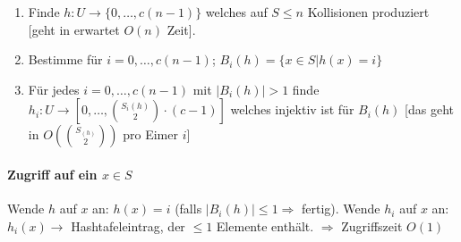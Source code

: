 \begin{enumerate}
	\item Finde $h : U \rightarrow \{ 0,\dots,c(n-1) \}$ welches auf $S \leq n$ Kollisionen produziert [geht in erwartet $O(n)$ Zeit]. 
	\item Bestimme für $i=0,\dots,c(n-1)$; $B_i(h)= \{ x \in S | h(x)=i \}$
	\item Für jedes $i=0,\dots,c(n-1)$ mit $|B_i(h)|>1$ finde $h_i : U \rightarrow [0,\dots,{S_i(h) \choose 2} \cdot (c-1)]$ welches injektiv ist für $B_i(h)$ [das geht in $O({S_(h) \choose 2})$ pro Eimer $i$]
\end{enumerate}

\paragraph*{Zugriff auf ein $x \in S$} Wende $h$ auf $x$ an: $h(x)=i$ (falls $|B_i(h)| \leq 1 \Rightarrow$ fertig). Wende $h_i$ auf $x$ an: $h_i(x) \rightarrow$ Hashtafeleintrag, der $\leq 1$ Elemente enthält. $\Rightarrow$ Zugriffszeit $O(1)$